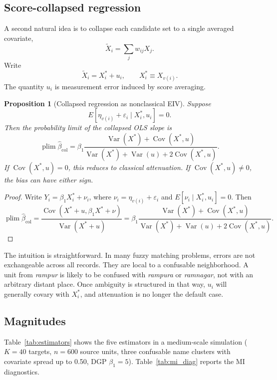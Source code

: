 \documentclass[12pt]{article}
\newtheorem{proposition}{Proposition}
\theoremstyle{remark}
\begin{document}
\subsection{Score-collapsed regression}

A second natural idea is to collapse each candidate set to a single averaged covariate,
\[
\tilde X_i=\sum_j w_{ij}X_j.
\]
Write
\[
\tilde X_i = X_i^* + u_i,\qquad X_i^*\equiv X_{v(i)}.
\]
The quantity $u_i$ is measurement error induced by score averaging.

\begin{proposition}[Collapsed regression as nonclassical EIV]
Suppose
\[
E[\eta_{v(i)}+\varepsilon_i\mid X_i^*,u_i]=0.
\]
Then the probability limit of the collapsed OLS slope is
\[
\operatorname{plim}\hat\beta_{\mathrm{col}}
=
\beta_1
\frac{\operatorname{Var}(X^*)+\operatorname{Cov}(X^*,u)}
{\operatorname{Var}(X^*)+\operatorname{Var}(u)+2\operatorname{Cov}(X^*,u)}.
\]
If $\operatorname{Cov}(X^*,u)=0$, this reduces to classical attenuation. If $\operatorname{Cov}(X^*,u)\neq 0$, the bias can have either sign.
\end{proposition}

\begin{proof}
Write $Y_i=\beta_1 X_i^*+\nu_i$, where $\nu_i=\eta_{v(i)}+\varepsilon_i$ and $E[\nu_i\mid X_i^*,u_i]=0$. Then
\[
\operatorname{plim}\hat\beta_{\mathrm{col}}
=
\frac{\operatorname{Cov}(X^*+u,\beta_1X^*+\nu)}
{\operatorname{Var}(X^*+u)}
=
\beta_1
\frac{\operatorname{Var}(X^*)+\operatorname{Cov}(X^*,u)}
{\operatorname{Var}(X^*)+\operatorname{Var}(u)+2\operatorname{Cov}(X^*,u)}.
\]
\end{proof}

The intuition is straightforward. In many fuzzy matching problems, errors are not exchangeable across all records. They are local to a confusable neighborhood. A unit from \emph{rampur} is likely to be confused with \emph{rampura} or \emph{ramnagar}, not with an arbitrary distant place. Once ambiguity is structured in that way, $u_i$ will generally covary with $X_i^*$, and attenuation is no longer the default case.

\subsection{Magnitudes}

Table~\ref{tab:estimators} shows the five estimators in a medium-scale simulation ($K=40$ targets, $n=600$ source units, three confusable name clusters with covariate spread up to 0.50, DGP $\beta_1=5$). Table~\ref{tab:mi_diag} reports the MI diagnostics.
\end{document}
